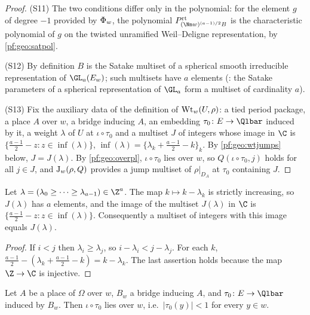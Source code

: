 \begin{proof}
(S11) The two conditions differ only in the polynomial: for the element $g$ of degree $-1$ provided by
$\Phi_w$, the polynomial $\geort_{(\Nm w)^{(a-1)/2}B}$ is the characteristic polynomial of $g$ on the
twisted unramified Weil--Deligne representation, by \cref{pf:geo:satpol}.

(S12) By definition $B$ is the Satake multiset of a spherical smooth irreducible representation of
$\GL_a(E_w)$; such multisets have $a$ elements (: the Satake
parameters of a spherical representation of $\GL_a$ form a multiset of cardinality $a$).

(S13) Fix the auxiliary data of the definition of $\mathrm{Wt}_w(U,\rho)$: a tied period package, a place
$A$ over $w$, a bridge inducing $A$, an embedding $\tau_0\colon E\to\Qlbar$ induced by it, a weight $\lambda$ of
$U$ at $\iota\circ\tau_0$ and a multiset $J$ of integers whose image in $\C$ is
$\{\frac{a-1}2-z:z\in\inf(\lambda)\}$, $\inf(\lambda)=\{\lambda_k+\frac{a-1}2-k\}_k$. By \cref{pf:geo:wtjumps} below,
$J=J(\lambda)$. By \cref{pf:geo:overpl}, $\iota\circ\tau_0$ lies over $w$, so $Q(\iota\circ\tau_0,j)$ holds for all $j\in J$,
and $\mathrm{J}_w(\rho,Q)$ provides a jump multiset of $\rho|_{D_A}$ at $\tau_0$ containing $J$.
\end{proof}

\begin{lemma}\label{pf:geo:wtjumps}
Let $\lambda=(\lambda_0\ge\dots\ge\lambda_{a-1})\in\Z^a$. The map $k\mapsto k-\lambda_k$ is strictly increasing, so
$J(\lambda)$ has $a$ elements, and the image of the multiset $J(\lambda)$ in $\C$ is
$\{\frac{a-1}2-z:z\in\inf(\lambda)\}$. Consequently a multiset of integers with this image equals
$J(\lambda)$.
\end{lemma}

\begin{proof}
If $i<j$ then $\lambda_i\ge\lambda_j$, so $i-\lambda_i<j-\lambda_j$. For each $k$,
$\frac{a-1}2-(\lambda_k+\frac{a-1}2-k)=k-\lambda_k$. The last assertion holds because the map $\Z\to\C$ is injective.
\end{proof}

\begin{lemma}\label{pf:geo:overpl}
Let $A$ be a place of $\Omega$ over $w$, $B_w$ a bridge inducing $A$, and $\tau_0\colon E\to\Qlbar$ induced by
$B_w$. Then $\iota\circ\tau_0$ lies over $w$, i.e.\ $|\tau_0(y)|<1$ for every $y\in w$.
\end{lemma}

